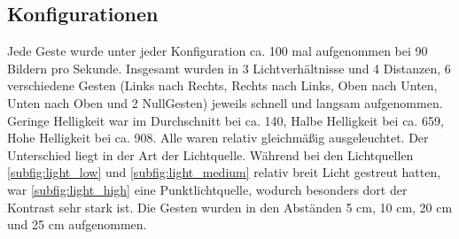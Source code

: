 \subsection{Konfigurationen}
Jede Geste wurde unter jeder Konfiguration ca. 100 mal aufgenommen bei 90 Bildern pro Sekunde. Insgesamt wurden in 3 Lichtverhältnisse und 4 Distanzen, 6 verschiedene Gesten (Links nach Rechts, Rechts nach Links,
Oben nach Unten, Unten nach Oben und 2 NullGesten) jeweils schnell und langsam aufgenommen. Geringe Helligkeit war im Durchschnitt bei ca. 140, Halbe Helligkeit bei ca. 659, Hohe Helligkeit bei ca. 908. Alle waren
relativ gleichmäßig ausgeleuchtet. Der Unterschied liegt in der Art der Lichtquelle. Während bei den Lichtquellen \ref{subfig:light_low} und \ref{subfig:light_medium} relativ breit Licht gestreut hatten,
war \ref{subfig:light_high} eine Punktlichtquelle, wodurch besonders dort der Kontrast sehr stark ist. Die Gesten wurden in den Abständen 5 cm, 10 cm, 20 cm und 25 cm aufgenommen.